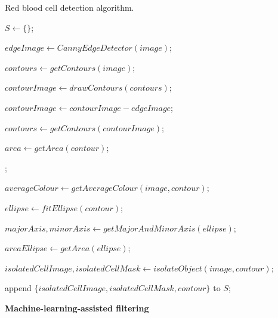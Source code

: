 \begin{algorithm}[!ht]
    \caption{Red blood cell detection algorithm.}\label{alg:rbc-detection}


    $S \gets \{\}$;

    $edgeImage \gets CannyEdgeDetector(image)$;

    $contours \gets getContours(image)$;

    $contourImage \gets drawContours(contours)$;

    $contourImage \gets contourImage - edgeImage$;

    $contours \gets getContours(contourImage)$;

     {
        $area \gets getArea(contour)$;

        ;
        {
            $averageColour \gets getAverageColour(image,contour)$;

            {
                $ellipse \gets fitEllipse(contour)$;

                $majorAxis,minorAxis \gets getMajorAndMinorAxis(ellipse)$;

                $areaEllipse \gets getArea(ellipse)$;

                {
                    $isolatedCellImage,isolatedCellMask \gets isolateObject(image,contour)$;

                    append $\{isolatedCellImage,isolatedCellMask,contour\}$ to $S$;
                }
            }
        }
    }
\end{algorithm}    

\noindent \textbf{Machine-learning-assisted filtering}

